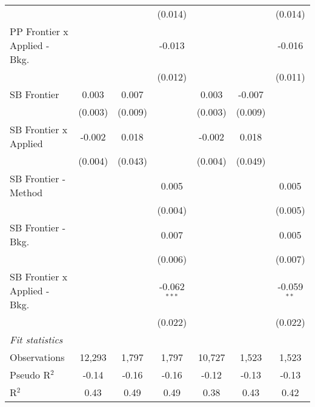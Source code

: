 \begin{tabular}{lcccccc}
                                  &               &                & (0.014)        &               &               & (0.014)\\   
   PP Frontier x Applied - Bkg.   &               &                & -0.013         &               &               & -0.016\\   
                                  &               &                & (0.012)        &               &               & (0.011)\\   
   SB Frontier                    & 0.003         & 0.007          &                & 0.003         & -0.007        &   \\   
                                  & (0.003)       & (0.009)        &                & (0.003)       & (0.009)       &   \\   
   SB Frontier x Applied          & -0.002        & 0.018          &                & -0.002        & 0.018         &   \\   
                                  & (0.004)       & (0.043)        &                & (0.004)       & (0.049)       &   \\   
   SB Frontier - Method           &               &                & 0.005          &               &               & 0.005\\   
                                  &               &                & (0.004)        &               &               & (0.005)\\   
   SB Frontier - Bkg.             &               &                & 0.007          &               &               & 0.005\\   
                                  &               &                & (0.006)        &               &               & (0.007)\\   
   SB Frontier x Applied - Bkg.   &               &                & -0.062$^{***}$ &               &               & -0.059$^{**}$\\   
                                  &               &                & (0.022)        &               &               & (0.022)\\   
   \midrule
   \emph{Fit statistics}\\
   Observations                   & 12,293        & 1,797          & 1,797          & 10,727        & 1,523         & 1,523\\  
   Pseudo R$^2$                   & -0.14         & -0.16          & -0.16          & -0.12         & -0.13         & -0.13\\  
   R$^2$                          & 0.43          & 0.49           & 0.49           & 0.38          & 0.43          & 0.42\\  
   

\end{tabular}
